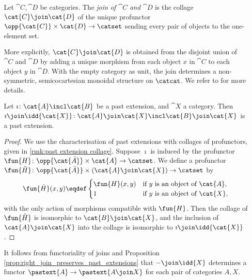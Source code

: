     \begin{definition} \label{dfn:join_of_categories}
    Let $\cat{C}, \cat{D}$ be categories.
    The \emph{join of $\cat{C}$ and $\cat{D}$} is the collage $\cat{C} \join \cat{D}$ of the unique profunctor $\opp{\cat{C}} \times \cat{D} \to \catset$ sending every pair of objects to the one-element set.

    More explicitly, $\cat{C} \join \cat{D}$ is obtained from the disjoint union of $\cat{C}$ and $\cat{D}$ by adding a unique morphism from each object $x$ in $\cat{C}$ to each object $y$ in $\cat{D}$.
    With the empty category as unit, the join determines a non-symmetric, semicocartesian monoidal structure on $\catcat$.
    We refer to \cite{joyal2008theory} for more details.
    \end{definition}

    \begin{proposition} \label{prop:right_join_preserves_past_extensions}
    Let $\imath\colon \cat{A} \incl \cat{B}$ be a past extension, and $\cat{X}$ a category.
    Then $\imath \join \idd{\cat{X}}\colon \cat{A} \join \cat{X} \incl \cat{B} \join \cat{X}$ is a past extension.
    \end{proposition}
    \begin{proof}
    We use the characterisation of past extensions with collages of profunctors, given in \autoref{rmk:past extension collage}.
    Suppose $\imath$ is induced by the profunctor $\fun{H}\colon \opp{\cat{\bar{A}}} \times \cat{A} \to \catset$.
    We define a profunctor $\fun{\tilde{H}}\colon \opp{\cat{\bar{A}}} \times (\cat{A}\join\cat{X}) \to \catset$ by
    \begin{equation*}
        \fun{\tilde{H}}(x, y) \eqdef \begin{cases}
            \fun{H}(x, y) & \text{if $y$ is an object of $\cat{A}$}, \\
            1 & \text{if $y$ is an object of $\cat{X}$},
        \end{cases}
    \end{equation*}
    with the only action of morphisms compatible with $\fun{H}$.
    Then the collage of $\fun{\tilde{H}}$ is isomorphic to $\cat{B} \join \cat{X}$, and the inclusion of $\cat{A}\join\cat{X}$ into the collage is isomorphic to $\imath \join \idd{\cat{X}}$.
    \end{proof}

    \begin{remark} \label{rmk:join_functor_of_past}
    It follows from functoriality of joins and Proposition \ref{prop:right_join_preserves_past_extensions} that $- \join \idd{X}$ determines a functor $\pastext{A} \to \pastext{A \join X}$ for each pair of categories $A, X$.
    \end{remark}

